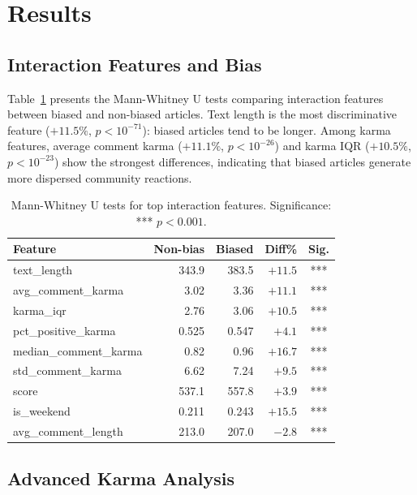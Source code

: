 \section{Results}
\label{sec:results}

\subsection{Interaction Features and Bias}

Table~\ref{tab:statistical_tests} presents the Mann-Whitney U tests comparing interaction features between biased and non-biased articles.
Text length is the most discriminative feature ($+11.5\%$, $p < 10^{-71}$): biased articles tend to be longer.
Among karma features, average comment karma ($+11.1\%$, $p < 10^{-26}$) and karma IQR ($+10.5\%$, $p < 10^{-23}$) show the strongest differences, indicating that biased articles generate more dispersed community reactions.

\begin{table}[t]
\centering
\small
\begin{tabular}{lrrrc}
\toprule
\textbf{Feature} & \textbf{Non-bias} & \textbf{Biased} & \textbf{Diff\%} & \textbf{Sig.} \\
\midrule
text\_length & 343.9 & 383.5 & $+11.5$ & *** \\
avg\_comment\_karma & 3.02 & 3.36 & $+11.1$ & *** \\
karma\_iqr & 2.76 & 3.06 & $+10.5$ & *** \\
pct\_positive\_karma & 0.525 & 0.547 & $+4.1$ & *** \\
median\_comment\_karma & 0.82 & 0.96 & $+16.7$ & *** \\
std\_comment\_karma & 6.62 & 7.24 & $+9.5$ & *** \\
score & 537.1 & 557.8 & $+3.9$ & *** \\
is\_weekend & 0.211 & 0.243 & $+15.5$ & *** \\
avg\_comment\_length & 213.0 & 207.0 & $-2.8$ & *** \\
\bottomrule
\end{tabular}
\caption{Mann-Whitney U tests for top interaction features. Significance: *** $p < 0.001$.}
\label{tab:statistical_tests}
\end{table}

\subsection{Advanced Karma Analysis}

